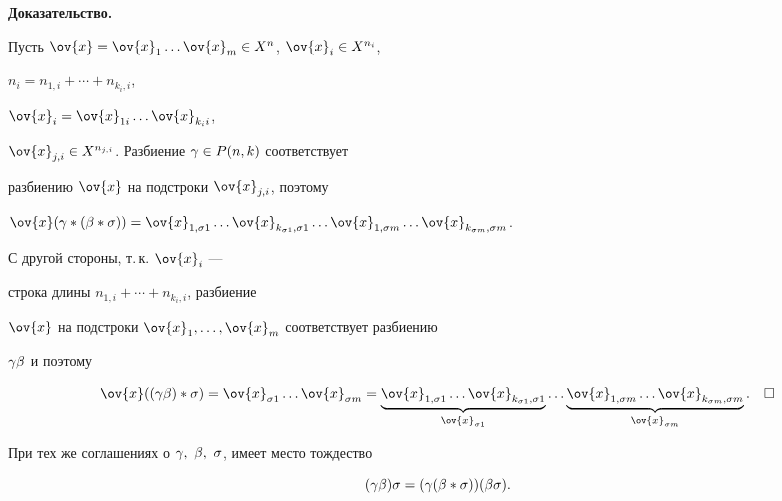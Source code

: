 {\bf Доказательство.}


Пусть $\ov{x}=\ov{x}_1\dotsc \ov{x}_m\in X^n$, $\ov{x}_i\in X^{n_i}$,


$n_i=n_{1,i}+ \dotsb + n_{k_i,i}$,


$\ov{x}_i=\ov{x}_{1 i}\dotsc \ov{x}_{k_i i}$,


$\ov{x}_{j,i}\in X^{n_{j,i}}$. Разбиение $\gamma\in P(n,k)$ соответствует


разбиению $\ov{x}$ на подстроки $\ov{x}_{j,i}$, поэтому\linebreak


$\ov{x}(\g * (\be*\s))=


\ov{x}_{1, \s 1}\dotsc \ov{x}_{k_{\s 1}, \s 1}\dotsc


\ov{x}_{1, \s m}\dotsc \ov{x}_{k_{\s m}, \s m}$.


С другой стороны, т.\,к. $\ov{x}_i$ ---


строка длины $n_{1, i}+\dotsb +n_{k_i, i}$, разбиение


$\ov{x}$ на подстроки $\ov{x}_1,\dotsc,\ov{x}_m$ соответствует разбиению


$\gamma\beta$ и поэтому


$$


\ov{x}((\g\be) * \s)=\ov{x}_{\s 1}\dotsc \ov{x}_{\s m}=


\underbrace{\ov{x}_{1, \s 1}\dotsc \ov{x}_{k_{\s 1}, \s 1}}_{\ov{x}_{\s 1}}


\dotsc


\underbrace{\ov{x}_{1, \s m}\dotsc \ov{x}_{k_{\s m}, \s m}}_{\ov{x}_{\s m}}.


\quad\square


$$








\begin{lem}


При тех же соглашениях о $\g,\ \be,\ \s$, имеет место тождество


\begin{equation}


(\g\be)\s=(\g(\be * \s))(\be\s).


\end{equation}


\end{lem}





